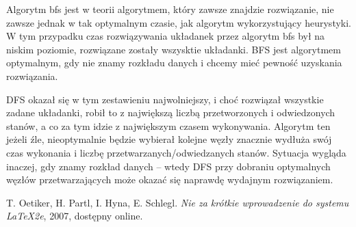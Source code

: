 \documentclass{classrep}
\begin{document}
Algorytm bfs jest w teorii algorytmem, który zawsze znajdzie rozwiązanie, nie zawsze jednak w tak optymalnym czasie, jak algorytm wykorzystujący heurystyki. W tym przypadku czas rozwiązywania układanek przez algorytm bfs był na niskim poziomie, rozwiązane zostały wszysktie układanki. BFS jest algorytmem optymalnym, gdy nie znamy rozkładu danych i chcemy mieć pewność uzyskania rozwiązania.

DFS okazał się w tym zestawieniu najwolniejszy, i choć rozwiązał wszystkie zadane układanki, robił to z największą liczbą przetworzonych i odwiedzonych stanów, a co za tym idzie z największym czasem wykonywania. Algorytm ten jeżeli źle, nieoptymalnie będzie wybierał kolejne węzły znacznie wydłuża swój czas wykonania i liczbę przetwarzanych/odwiedzanych stanów. Sytuacja wygląda inaczej, gdy znamy rozkład danych – wtedy DFS przy dobraniu optymalnych węzłów przetwarzających może okazać się naprawdę wydajnym rozwiązaniem.
\begin{thebibliography}{0}
   T. Oetiker, H. Partl, I. Hyna, E. Schlegl.
    \textsl{Nie za krótkie wprowadzenie do systemu \LaTeX2e}, 2007, dostępny online.
\end{thebibliography}
\end{document}
